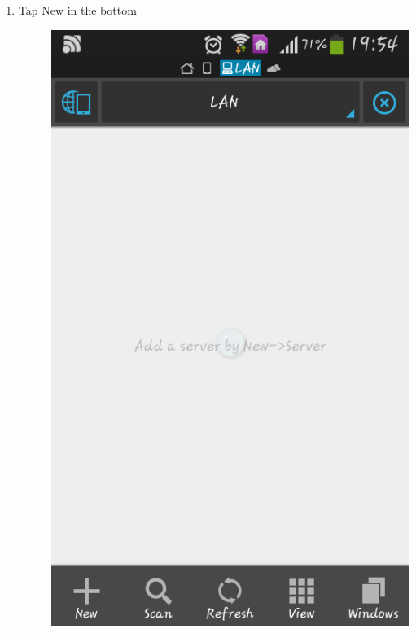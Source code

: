 \documentclass[letterpaper,10pt,english]{sphinxmanual}
\begin{document}
\begin{enumerate}
\item {} \begin{description}
\item[{Tap New in the bottom}] \leavevmode
\includegraphics{es1.png}

\end{description}


\end{enumerate}
\end{document}
